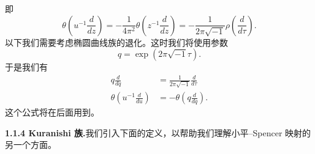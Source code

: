 \begin{example}[1.4]
即
\[
  \theta\left(u^{-1}\frac{d}{dz}\right)=-\frac{1}{4\pi^2}\theta\left(z^{-1}\frac{d}{dz}\right)
  =-\frac{1}{2\pi\sqrt{-1}}\rho\left(\frac{d}{d\tau}\right).
\]
以下我们需要考虑椭圆曲线族的退化。这时我们将使用参数
\[
  q=\exp(2\pi\sqrt{-1}\tau).
\]
于是我们有
\[
\begin{aligned}
  q\frac{d}{dq} &= \frac{1}{2\pi\sqrt{-1}}\frac{d}{d\tau}\\
  \theta\left(u^{-1}\frac{d}{du}\right) &= -\theta\left(q\frac{d}{dq}\right).
\end{aligned}
\]
这个公式将在后面用到。
\end{example}


\noindent\textbf{1.1.4 Kuranishi 族.}\quad 我们引入下面的定义，以帮助我们理解小平–Spencer 映射的另一个方面。

